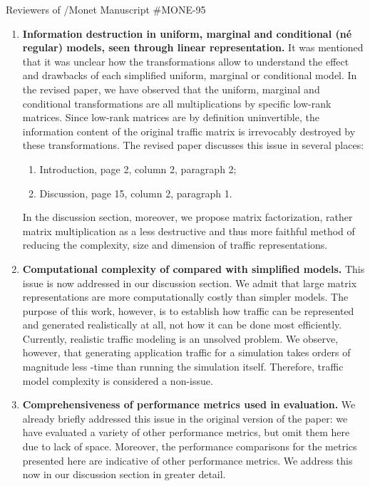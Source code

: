 \documentclass{letter}
\begin{document}
\begin{letter}{Reviewers of /Monet Manuscript \#MONE-95}
\begin{enumerate}
\item \textbf{Information destruction in uniform, marginal and conditional (n\'e regular) models, seen through linear representation.}
It was mentioned that it was unclear how the transformations allow to understand the effect and drawbacks of each simplified uniform, marginal or conditional model.
In the revised paper, we have observed that the uniform, marginal and conditional transformations are all multiplications by specific low-rank matrices.
Since low-rank matrices are by definition uninvertible, the information content of the original traffic matrix is irrevocably destroyed by these transformations.
The revised paper discusses this issue in several places:
\begin{enumerate}
\item Introduction, page 2, column 2, paragraph 2;
\item Discussion, page 15, column 2, paragraph 1.
\end{enumerate}
In the discussion section, moreover, we propose matrix factorization, rather matrix multiplication as a less destructive and thus more faithful method of reducing the complexity, size and dimension of traffic representations.

\item \textbf{Computational complexity of  compared with simplified models.}
This issue is now addressed in our discussion section.
We admit that large matrix representations are more computationally costly than simpler models.
The purpose of this work, however, is to establish how traffic can be represented and generated realistically at all, not how it can be done most efficiently.
Currently, realistic traffic modeling is an unsolved problem.
We observe, however, that generating application traffic for a simulation takes orders of magnitude less -time than running the simulation itself.
Therefore, traffic model complexity is considered a non-issue.

\item \textbf{Comprehensiveness of performance metrics used in evaluation.}
We already briefly addressed this issue in the original version of the paper:
we have evaluated a variety of other performance metrics, but omit them here due to lack of space.
Moreover, the performance comparisons for the metrics presented here are indicative of other performance metrics.
We address this now in our discussion section in greater detail.


\end{enumerate}
\end{letter}
\end{document}
